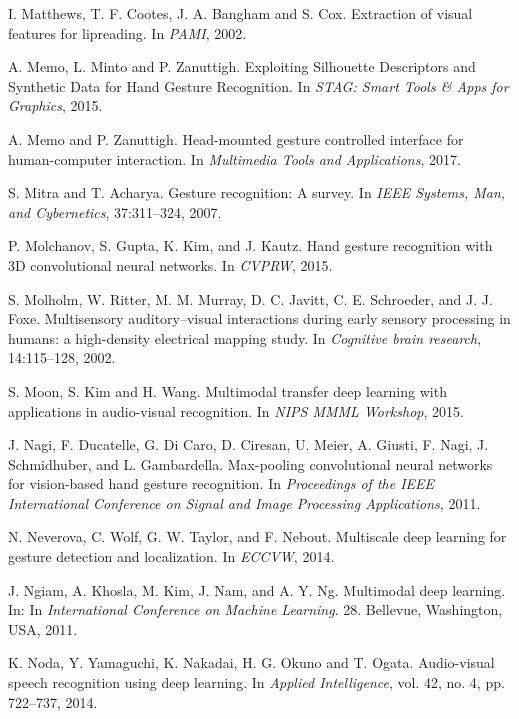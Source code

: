 \begin{thebibliography}{99}
  I. Matthews, T. F. Cootes, J. A. Bangham and S. Cox. Extraction of visual
  features for lipreading. In \textit{PAMI}, 2002.

  A. Memo, L. Minto and P. Zanuttigh.  Exploiting Silhouette Descriptors and
  Synthetic Data for Hand Gesture Recognition. In \textit{STAG: Smart
  Tools \& Apps for Graphics}, 2015.

  A. Memo and P. Zanuttigh. Head-mounted gesture controlled interface
  for human-computer interaction. In \textit{Multimedia Tools and
  Applications}, 2017.

  S. Mitra and T. Acharya. Gesture recognition: A survey. 
  In \textit{IEEE Systems, Man, and Cybernetics}, 37:311–324, 2007. 

  P. Molchanov, S. Gupta, K. Kim, and J. Kautz. Hand gesture recognition 
  with 3D convolutional neural networks. In \textit{CVPRW}, 2015.

  S. Molholm, W. Ritter, M. M. Murray, D. C. Javitt, C. E. Schroeder,
  and J. J. Foxe. Multisensory auditory–visual interactions during early
  sensory processing in humans: a high-density electrical mapping study.
  In \textit{Cognitive brain research}, 14:115--128, 2002.

  S. Moon, S. Kim and H. Wang. Multimodal transfer deep learning with
    applications in audio-visual recognition. In \textit{NIPS MMML
    Workshop}, 2015.

  J. Nagi, F. Ducatelle, G. Di Caro, D. Ciresan, U. Meier, A. Giusti,
  F. Nagi, J. Schmidhuber, and L. Gambardella.
  Max-pooling convolutional neural networks for vision-based hand 
  gesture recognition.
  In \textit{Proceedings of the IEEE International Conference on
  Signal and Image Processing Applications}, 2011.

  N. Neverova, C. Wolf, G. W. Taylor, and F. Nebout.  Multiscale deep
  learning for gesture detection and localization. In \textit{ECCVW}, 2014.

  J. Ngiam, A. Khosla, M. Kim, J. Nam, and A. Y. Ng. 
  Multimodal deep learning. In:
  In \textit{International Conference on Machine Learning}.  28. 
  Bellevue, Washington, USA, 2011.

  K. Noda, Y. Yamaguchi, K. Nakadai, H. G. Okuno and T. Ogata. Audio-visual
  speech recognition using deep learning.  In \textit{Applied Intelligence},
  vol. 42, no. 4, pp. 722–737, 2014.


\end{thebibliography}
